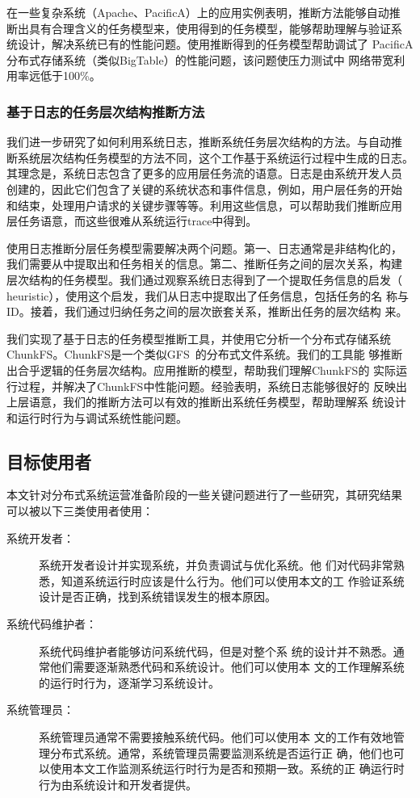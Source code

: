 在一些复杂系统（Apache、PacificA）上的应用实例表明，推断方法能够自动推
断出具有合理含义的任务模型来，使用得到的任务模型，能够帮助理解与验证系
统设计，解决系统已有的性能问题。使用推断得到的任务模型帮助调试了
PacificA 分布式存储系统（类似BigTable）的性能问题，该问题使压力测试中
网络带宽利用率远低于100\%。


\subsubsection*{基于日志的任务层次结构推断方法}


我们进一步研究了如何利用系统日志，推断系统任务层次结构的方法。与自动推
断系统层次结构任务模型的方法不同，这个工作基于系统运行过程中生成的日志。
其理念是，系统日志包含了更多的应用层任务流的语意。日志是由系统开发人员
创建的，因此它们包含了关键的系统状态和事件信息，例如，用户层任务的开始
和结束，处理用户请求的关键步骤等等。利用这些信息，可以帮助我们推断应用
层任务语意，而这些很难从系统运行trace中得到。

使用日志推断分层任务模型需要解决两个问题。第一、日志通常是非结构化的，
我们需要从中提取出和任务相关的信息。第二、推断任务之间的层次关系，构建
层次结构的任务模型。我们通过观察系统日志得到了一个提取任务信息的启发（
heuristic），使用这个启发，我们从日志中提取出了任务信息，包括任务的名
称与ID。接着，我们通过归纳任务之间的层次嵌套关系，推断出任务的层次结构
来。

我们实现了基于日志的任务模型推断工具，并使用它分析一个分布式存储系统
ChunkFS。ChunkFS是一个类似GFS~\cite{gfs}的分布式文件系统。我们的工具能
够推断出合乎逻辑的任务层次结构。应用推断的模型，帮助我们理解ChunkFS的
实际运行过程，并解决了ChunkFS中性能问题。经验表明，系统日志能够很好的
反映出上层语意，我们的推断方法可以有效的推断出系统任务模型，帮助理解系
统设计和运行时行为与调试系统性能问题。

\subsection{目标使用者}

本文针对分布式系统运营准备阶段的一些关键问题进行了一些研究，其研究结果
可以被以下三类使用者使用：

\begin{description}

  \item[系统开发者：] 系统开发者设计并实现系统，并负责调试与优化系统。他
  们对代码非常熟悉，知道系统运行时应该是什么行为。他们可以使用本文的工
  作验证系统设计是否正确，找到系统错误发生的根本原因。

  \item[系统代码维护者：] 系统代码维护者能够访问系统代码，但是对整个系
  统的设计并不熟悉。通常他们需要逐渐熟悉代码和系统设计。他们可以使用本
  文的工作理解系统的运行时行为，逐渐学习系统设计。

  \item[系统管理员：] 系统管理员通常不需要接触系统代码。他们可以使用本
  文的工作有效地管理分布式系统。通常，系统管理员需要监测系统是否运行正
  确，他们也可以使用本文工作监测系统运行时行为是否和预期一致。系统的正
  确运行时行为由系统设计和开发者提供。

\end{description}

